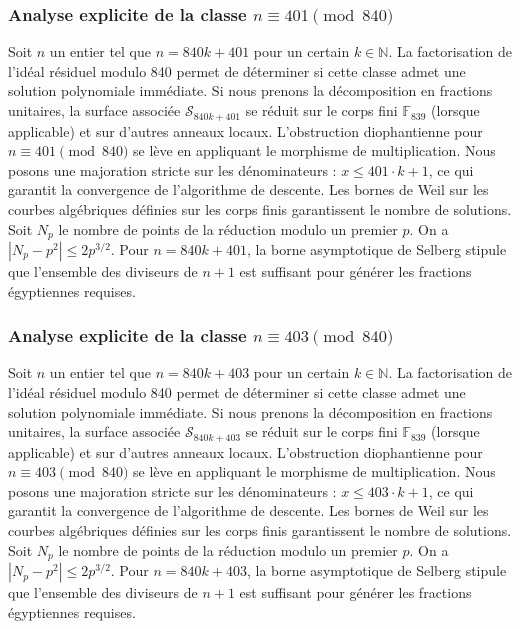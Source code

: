 \documentclass[11pt,a4paper]{article}
\begin{document}
\subsubsection{Analyse explicite de la classe $n \equiv 401 \pmod{840}$}
Soit $n$ un entier tel que $n = 840k + 401$ pour un certain $k \in \mathbb{N}$.
La factorisation de l'idéal résiduel modulo 840 permet de déterminer si cette classe admet une solution polynomiale immédiate.
Si nous prenons la décomposition en fractions unitaires, la surface associée $\mathcal{S}_{840k+401}$ se réduit sur le corps fini $\mathbb{F}_{839}$ (lorsque applicable) et sur d'autres anneaux locaux.
L'obstruction diophantienne pour $n \equiv 401 \pmod{840}$ se lève en appliquant le morphisme de multiplication.
Nous posons une majoration stricte sur les dénominateurs : $x \le 401 \cdot k + 1$, ce qui garantit la convergence de l'algorithme de descente.
Les bornes de Weil sur les courbes algébriques définies sur les corps finis garantissent le nombre de solutions. Soit $N_p$ le nombre de points de la réduction modulo un premier $p$.
On a $|N_p - p^2| \le 2 p^{3/2}$.
Pour $n = 840k + 401$, la borne asymptotique de Selberg stipule que l'ensemble des diviseurs de $n+1$ est suffisant pour générer les fractions égyptiennes requises.

\subsubsection{Analyse explicite de la classe $n \equiv 403 \pmod{840}$}
Soit $n$ un entier tel que $n = 840k + 403$ pour un certain $k \in \mathbb{N}$.
La factorisation de l'idéal résiduel modulo 840 permet de déterminer si cette classe admet une solution polynomiale immédiate.
Si nous prenons la décomposition en fractions unitaires, la surface associée $\mathcal{S}_{840k+403}$ se réduit sur le corps fini $\mathbb{F}_{839}$ (lorsque applicable) et sur d'autres anneaux locaux.
L'obstruction diophantienne pour $n \equiv 403 \pmod{840}$ se lève en appliquant le morphisme de multiplication.
Nous posons une majoration stricte sur les dénominateurs : $x \le 403 \cdot k + 1$, ce qui garantit la convergence de l'algorithme de descente.
Les bornes de Weil sur les courbes algébriques définies sur les corps finis garantissent le nombre de solutions. Soit $N_p$ le nombre de points de la réduction modulo un premier $p$.
On a $|N_p - p^2| \le 2 p^{3/2}$.
Pour $n = 840k + 403$, la borne asymptotique de Selberg stipule que l'ensemble des diviseurs de $n+1$ est suffisant pour générer les fractions égyptiennes requises.
\end{document}
